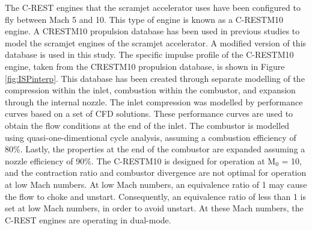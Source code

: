 The C-REST engines that the scramjet accelerator uses have been configured to fly between Mach 5 and 10. This type of engine is known as a C-RESTM10 engine\cite{Preller2017b}.  
A \textsf{CRESTM10} propulsion database has been used in previous studies to model the scramjet engines of the scramjet accelerator\cite{Preller2017b}. A modified version of this database is used in this study. The specific impulse profile of the C-RESTM10 engine, taken from the \textsf{CRESTM10} propulsion database, is shown in Figure \ref{fig:ISPinterp}. This database has been created through separate modelling of the compression within the inlet, combustion within the combustor, and expansion through the internal nozzle\cite{Jazra2010,Preller2018a}. The inlet compression was modelled by performance curves based on a set of CFD solutions\cite{Jazra2010,Preller2018a}. These performance curves are used to obtain the flow conditions at the end of the inlet. The combustor is modelled using quasi-one-dimentional cycle analysis, assuming a combustion efficiency of 80\%\cite{Jazra2010,Preller2018a}. Lastly, the properties at the end of the combustor are expanded assuming a nozzle efficiency of 90\%\cite{Preller2018a}.
The C-RESTM10 is designed for operation at M$_0$ = 10, and the contraction ratio and combustor divergence are not optimal for operation at low Mach numbers. At low Mach numbers, an equivalence ratio of 1 may cause the flow to choke and unstart. 
Consequently, an equivalence ratio of less than 1 is set at low Mach numbers, in order to avoid unstart\cite{Preller2018a}. At these Mach numbers, the C-REST engines are operating in dual-mode\cite{Preller2018a}. 





